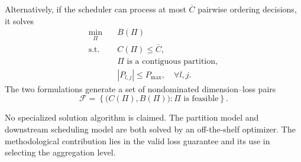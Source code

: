 Alternatively, if the scheduler can process at most \(\overline C\) pairwise ordering decisions, it solves
\begin{align}
\min_{\Pi}\quad & B(\Pi)\\
\text{s.t.}\quad & C(\Pi)\le\overline C,\\
& \Pi\text{ is a contiguous partition},\\
& |P_{l,j}|\le P_{\max},\quad \forall l,j.
\label{eq:size-budget-formulation}
\end{align}
The two formulations generate a set of nondominated dimension--loss pairs
\begin{equation}
\mathcal{F}
=
\left\{
\big(C(\Pi),B(\Pi)\big):
\Pi\text{ is feasible}
\right\}.
\end{equation}

No specialized solution algorithm is claimed. The partition model and downstream scheduling model are both solved by an off-the-shelf optimizer. The methodological contribution lies in the valid loss guarantee and its use in selecting the aggregation level.
